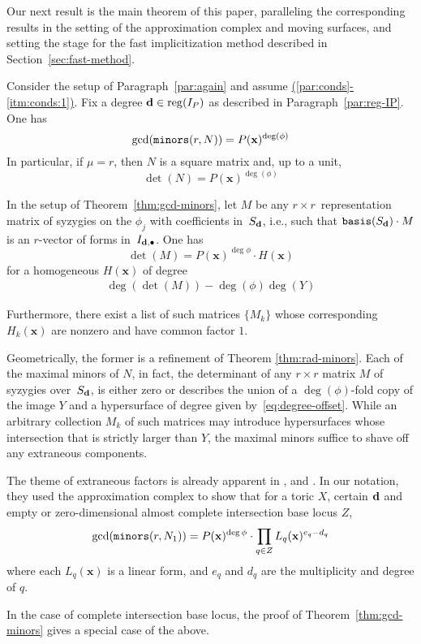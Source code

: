 \documentclass[fleqn,reqno]{amsart}
\renewcommand{\itmref}[2]{{\normalfont\hyperref[#1]{(\ref*{#2}-\ref*{#1})}}}
\begin{document}
\begin{paragraf*}
Our next result is the main theorem of this paper,
paralleling the corresponding results in the setting of
the approximation complex and moving surfaces,
and setting the stage for
the fast implicitization method described in Section~\ref{sec:fast-method}.
\end{paragraf*}

\begin{theorem}
\label{thm:gcd-minors}
Consider the setup of Paragraph~\ref{par:again} and assume \itmref{itm:conds:1}{par:conds}.
Fix a degree $\mathbf d\in\operatorname{reg}(I_P)$ as described in Paragraph~\ref{par:reg-IP}.
One has
\[
	\gcd(\mathop{\tt minors}(r, N))=P(\mathbf x)^{\deg(\phi)}
\]
In particular, if $\mu=r$, then $N$ is a square matrix and, up to a unit,
\[
	\det(N)=P(\mathbf x)^{\deg(\phi)}
\]
\end{theorem}

\begin{corollary}
\label{thm:detM}
In the setup of Theorem~\ref{thm:gcd-minors},
let $M$ be any $r\times r$~representation matrix of syzygies on the $\phi_j$
with coefficients in~$S_\mathbf d$,
i.e., such that $\mathop{\tt basis}(S_\mathbf d)\cdot M$ is an $r$-vector of forms in~$I_{\mathbf d,\bullet}$.
One has
\[
	\det(M)=P(\mathbf x)^{\deg\phi}\cdot H(\mathbf x)
\]
for a homogeneous $H(\mathbf x)$ of degree
\begin{align}
\label{eq:degree-offset}
\deg(\det(M))-\deg(\phi)\deg(Y)
\end{align}

Furthermore, there exist a list of such matrices $\{M_k\}$ whose
corresponding $H_k(\mathbf x)$ are nonzero and have common factor $1$.
\end{corollary}

\begin{paragraf*}
Geometrically, the former is a refinement of Theorem \ref{thm:rad-minors}.
Each of the maximal minors of $N$, in fact,
the determinant of any $r\times r$ matrix $M$ of syzygies over~$S_\mathbf d$, is either zero
or describes the union of a $\deg(\phi)$-fold copy of the image $Y$ and
a hypersurface of degree given by~\eqref{eq:degree-offset}.
While an arbitrary collection $M_k$ of such matrices may introduce hypersurfaces
whose intersection that is strictly larger than $Y$,
the maximal minors suffice to shave off any extraneous components.

The theme of extraneous factors is already apparent in
\citet{BCD-03}, \citet{BCJ-09} and \citet{BDD-09}.
In our notation, they used the approximation complex to show that for a toric $X$,
certain $\mathbf d$ and empty or zero-dimensional almost complete intersection base locus $Z$,
\[
	\gcd(\mathop{\tt minors}(r,N_1))=P(\mathbf x)^{\deg\phi}\cdot\prod_{q\in Z} L_q(\mathbf x)^{e_q-d_q}
\]
where each $L_q(\mathbf x)$ is a linear form, and
$e_q$ and $d_q$ are the multiplicity and degree of $q$.

In the case of complete intersection base locus, the proof of Theorem~\ref{thm:gcd-minors}
gives a special case of the above.
\end{paragraf*}
\end{document}
